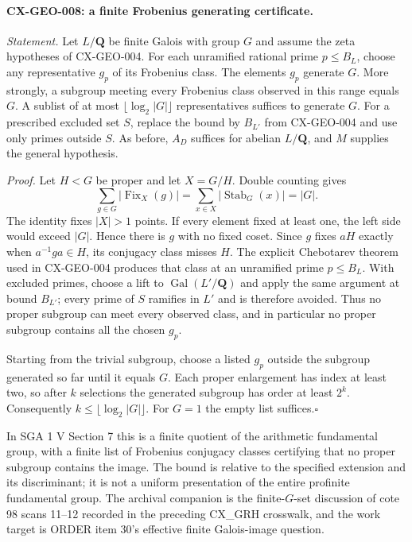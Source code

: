\documentclass[11pt,a4paper]{article}
\begin{document}
\paragraph{CX-GEO-008: a finite Frobenius generating certificate.}
\emph{Statement.} Let $L/\mathbf Q$ be finite Galois with group $G$ and
assume the zeta hypotheses of CX-GEO-004. For each unramified rational
prime $p\leq B_L$, choose any representative $g_p$ of its Frobenius class.
The elements $g_p$ generate $G$. More strongly, a subgroup meeting every
Frobenius class observed in this range equals $G$. A sublist of at most
$\lfloor\log_2|G|\rfloor$ representatives suffices to generate $G$.
For a prescribed excluded set $S$, replace the bound by $B_{L'}$ from
CX-GEO-004 and use only primes outside $S$. As before, $A_D$ suffices for
abelian $L/\mathbf Q$, and $M$ supplies the general hypothesis.

\emph{Proof.} Let $H<G$ be proper and let $X=G/H$. Double counting gives
\[
 \sum_{g\in G}|\operatorname{Fix}_X(g)|
      =\sum_{x\in X}|\operatorname{Stab}_G(x)|=|G|.
\]
The identity fixes $|X|>1$ points. If every element fixed at least one,
the left side would exceed $|G|$. Hence there is $g$ with no fixed coset.
Since $g$ fixes $aH$ exactly when $a^{-1}ga\in H$, its conjugacy class
misses $H$. The explicit Chebotarev theorem used in CX-GEO-004 produces
that class at an unramified prime $p\leq B_L$. With excluded primes,
choose a lift to $\operatorname{Gal}(L'/\mathbf Q)$ and apply the same
argument at bound $B_{L'}$; every prime of $S$ ramifies in $L'$ and is
therefore avoided. Thus no proper subgroup can meet every observed class,
and in particular no proper subgroup contains all the chosen $g_p$.

Starting from the trivial subgroup, choose a listed $g_p$ outside the
subgroup generated so far until it equals $G$. Each proper enlargement
has index at least two, so after $k$ selections the generated subgroup has
order at least $2^k$. Consequently $k\leq\lfloor\log_2|G|\rfloor$.
For $G=1$ the empty list suffices.\hfill$\square$

In SGA 1 V Section 7 this is a finite quotient of the arithmetic
fundamental group, with a finite list of Frobenius conjugacy classes
certifying that no proper subgroup contains the image. The bound is
relative to the specified extension and its discriminant; it is not a
uniform presentation of the entire profinite fundamental group. The
archival companion is the finite-$G$-set discussion of cote 98 scans
11--12 recorded in the preceding CX\_GRH crosswalk, and the work target
is ORDER item 30's effective finite Galois-image question.
\end{document}
